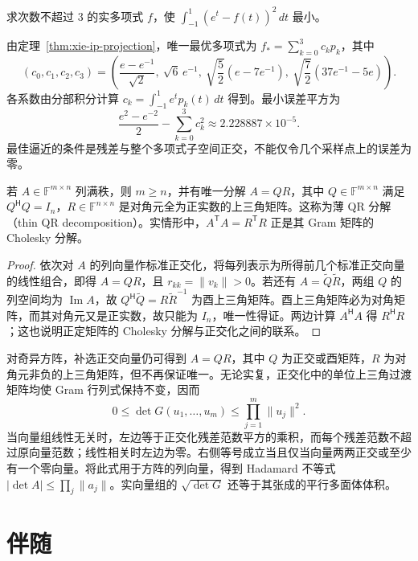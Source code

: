 \begin{example}
求次数不超过 $3$ 的实多项式 $f$，使 $\int_{-1}^1(e^t-f(t))^2\,dt$ 最小。
\end{example}
\begin{solve}
由定理~\ref{thm:xie-ip-projection}，唯一最优多项式为 $f_*=\sum_{k=0}^3c_kp_k$，其中
\[
(c_0,c_1,c_2,c_3)=\left(
\frac{e-e^{-1}}{\sqrt2},\ \sqrt6\,e^{-1},\
\sqrt{\frac52}(e-7e^{-1}),\
\sqrt{\frac72}(37e^{-1}-5e)\right).
\]
各系数由分部积分计算 $c_k=\int_{-1}^1e^tp_k(t)\,dt$ 得到。最小误差平方为
\[
\frac{e^2-e^{-2}}2-\sum_{k=0}^3c_k^2
\approx 2.228887\times10^{-5}.
\]
最佳逼近的条件是残差与整个多项式子空间正交，不能仅令几个采样点上的误差为零。
\end{solve}

\begin{proposition}
\label{prop:xie-ip-qr}
若 $A\in\mathbb F^{m\times n}$ 列满秩，则 $m\geq n$，并有唯一分解 $A=QR$，其中 $Q\in\mathbb F^{m\times n}$ 满足 $Q^{\mathsf H}Q=I_n$，$R\in\mathbb F^{n\times n}$ 是对角元全为正实数的上三角矩阵。这称为薄 QR 分解（thin QR decomposition）。实情形中，$A^{\mathsf T}A=R^{\mathsf T}R$ 正是其 Gram 矩阵的 Cholesky 分解。
\end{proposition}
\begin{proof}
依次对 $A$ 的列向量作标准正交化，将每列表示为所得前几个标准正交向量的线性组合，即得 $A=QR$，且 $r_{kk}=\|v_k\|>0$。若还有 $A=\widetilde Q\widetilde R$，两组 $Q$ 的列空间均为 $\operatorname{Im}A$，故 $Q^{\mathsf H}\widetilde Q=R\widetilde R^{-1}$ 为酉上三角矩阵。酉上三角矩阵必为对角矩阵，而其对角元又是正实数，故只能为 $I_n$，唯一性得证。两边计算 $A^{\mathsf H}A$ 得 $R^{\mathsf H}R$；这也说明正定矩阵的 Cholesky 分解与正交化之间的联系。
\end{proof}

对奇异方阵，补选正交向量仍可得到 $A=QR$，其中 $Q$ 为正交或酉矩阵，$R$ 为对角元非负的上三角矩阵，但不再保证唯一。无论实复，正交化中的单位上三角过渡矩阵均使 Gram 行列式保持不变，因而
\begin{equation}
\label{eq:xie-ip-gram-hadamard}
0\leq\det G(u_1,\ldots,u_m)\leq\prod_{j=1}^m\|u_j\|^2.
\end{equation}
当向量组线性无关时，左边等于正交化残差范数平方的乘积，而每个残差范数不超过原向量范数；线性相关时左边为零。右侧等号成立当且仅当向量两两正交或至少有一个零向量。将此式用于方阵的列向量，得到 Hadamard 不等式 $|\det A|\leq\prod_j\|a_j\|$。实向量组的 $\sqrt{\det G}$ 还等于其张成的平行多面体体积。

\section{伴随}
\label{sec:xie-ip-adjoint}

